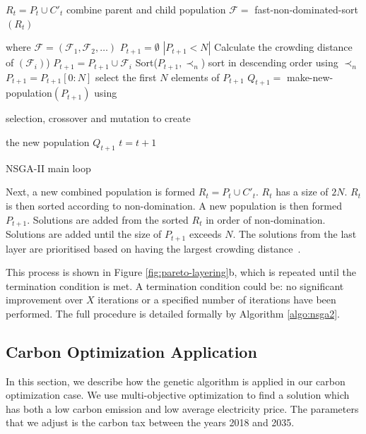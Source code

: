\begin{algorithm}
	\begin{algorithmic}[1]
		\State $R_t=P_t \cup C'_t$ combine parent and child population
		\State $\mathcal{F} = $ fast-non-dominated-sort $(R_t)$ 
		
		where $\mathcal{F}=(\mathcal{F}_1, \mathcal{F}_2,\ldots)$
		\State $P_{t+1}=\emptyset$
		\While $\left|P_{t+1}<N\right|$
		\State Calculate the crowding distance of $(\mathcal{F}_i)$)
		\State $P_{t+1}=P_{t+1}\cup \mathcal{F}_i$
		\EndWhile
		\State Sort($P_{t+1}, \prec_n$) sort in descending order using $\prec_n$
		\State $P_{t+1} = P_{t+1}[0:N]$ select the first $N$ elements of $P_{t+1}$
		\State $Q_{t+1} = $ make-new-population$(P_{t+1})$ using 
		
		selection, crossover and mutation to create 
		
		the new population $Q_{t+1}$
		\State $t=t+1$
		\caption{NSGA-II main loop \cite{Valkanas2014}}
		\label{algo:nsga2}
	\end{algorithmic}
\end{algorithm}


Next, a new combined population is formed $R_{t}=P_{t} \cup C'_{t}$. $R_t$ has a size of $2N$. $R_t$ is then sorted according to non-domination. A new population is then formed $P_{t+1}$. Solutions are added from the sorted $R_t$ in order of non-domination. Solutions are added until the size of $P_{t+1}$ exceeds $N$. The solutions from the last layer are prioritised based on having the largest crowding distance~\cite{Valkanas2014}.

This process is shown in Figure \ref{fig:pareto-layering}b, which is repeated until the termination condition is met. A termination condition could be:  no significant improvement over $X$ iterations or a specified number of iterations have been performed. The full procedure is detailed formally by Algorithm \ref{algo:nsga2}.


\subsection{Carbon Optimization Application}

In this section, we describe how the genetic algorithm is applied in our carbon optimization case. We use multi-objective optimization to find a solution which has both a low carbon emission and low average electricity price. The parameters that we adjust is the carbon tax between the years 2018 and 2035.

